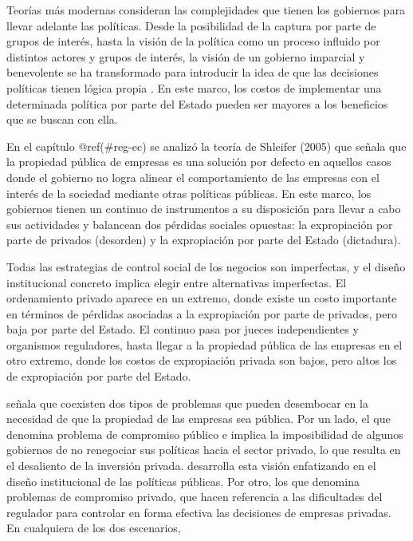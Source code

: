 \documentclass[
  12pt,
  spanish,
]{book}
\begin{document}
Teorías más modernas consideran las complejidades que tienen los
gobiernos para llevar adelante las políticas. Desde la posibilidad de la
captura por parte de grupos de interés, hasta la visión de la política
como un proceso influido por distintos actores y grupos de interés, la
visión de un gobierno imparcial y benevolente se ha transformado para
introducir la idea de que las decisiones políticas tienen lógica propia
\citep{Dixit1997}. En este marco, los costos de implementar una
determinada política por parte del Estado pueden ser mayores a los
beneficios que se buscan con ella.

En el capítulo @ref(\#reg-ec) se analizó la teoría de Shleifer (2005)
que señala que la propiedad pública de empresas es una solución por
defecto en aquellos casos donde el gobierno no logra alinear el
comportamiento de las empresas con el interés de la sociedad mediante
otras políticas públicas. En este marco, los gobiernos tienen un
continuo de instrumentos a su disposición para llevar a cabo sus
actividades y balancean dos pérdidas sociales opuestas: la expropiación
por parte de privados (desorden) y la expropiación por parte del Estado
(dictadura).

Todas las estrategias de control social de los negocios son imperfectas,
y el diseño institucional concreto implica elegir entre alternativas
imperfectas. El ordenamiento privado aparece en un extremo, donde existe
un costo importante en términos de pérdidas asociadas a la expropiación
por parte de privados, pero baja por parte del Estado. El continuo pasa
por jueces independientes y organismos reguladores, hasta llegar a la
propiedad pública de las empresas en el otro extremo, donde los costos
de expropiación privada son bajos, pero altos los de expropiación por
parte del Estado.

\citet{Perotti2004} señala que coexisten dos tipos de problemas que
pueden desembocar en la necesidad de que la propiedad de las empresas
sea pública. Por un lado, el que denomina problema de compromiso público
e implica la imposibilidad de algunos gobiernos de no renegociar sus
políticas hacia el sector privado, lo que resulta en el desaliento de la
inversión privada. \citet{Bergara2003} desarrolla esta visión
enfatizando en el diseño institucional de las políticas públicas. Por
otro, los que denomina problemas de compromiso privado, que hacen
referencia a las dificultades del regulador para controlar en forma
efectiva las decisiones de empresas privadas. En cualquiera de los dos
escenarios,
\end{document}
